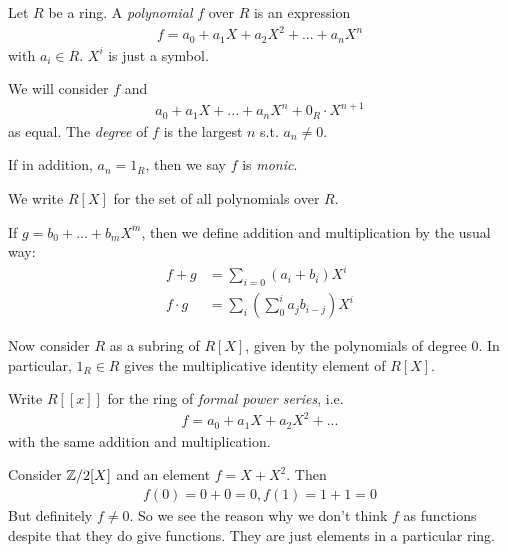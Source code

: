 \documentclass[a4paper]{article}
\begin{document}
\begin{eg}
Let $R$ be a ring. A \emph{polynomial} $f$ over $R$ is an expression
\begin{equation*}
\begin{aligned}
f=a_0+a_1X+a_2X^2 + ... + a_n X^n
\end{aligned}
\end{equation*}
with $a_i \in R$. $X^i$ is just a symbol.

We will consider $f$ and 
\begin{equation*}
\begin{aligned}
a_0+a_1 X +... + a_n X^n + 0_R \cdot X^{n+1}
\end{aligned}
\end{equation*}
as equal. The \emph{degree} of $f$ is the largest $n$ s.t. $a_n \neq 0$.

If in addition, $a_n = 1_R$, then we say $f$ is \emph{monic}.

We write $R[X]$ for the set of all polynomials over $R$.

If $g=b_0+...+b_m X^m$, then we define addition and multiplication by the usual way:
\begin{equation*}
\begin{aligned}
f+g &= \sum_{i=0} (a_i+b_i) X^i\\
f\cdot g &= \sum_i \left(\sum_0^i a_jb_{i-j}\right)X^i
\end{aligned}
\end{equation*}

Now consider $R$ as a subring of $R[X]$, given by the polynomials of degree $0$. In particular, $1_R \in R$ gives the multiplicative identity element of $R[X]$.
\end{eg}

\begin{eg}
Write $R[[x]]$ for the ring of \emph{formal power series}, i.e.
\begin{equation*}
\begin{aligned}
f =a_0+a_1 X + a_2 X^2 + ...
\end{aligned}
\end{equation*}
with the same addition and multiplication.

Consider $\mathbb{Z}/2[X]$ and an element $f = X+X^2$. Then
\begin{equation*}
\begin{aligned}
f(0)=0+0=0,
f(1) = 1+1=0
\end{aligned}
\end{equation*}
But definitely $f \neq 0$. So we see the reason why we don't think $f$ as functions despite that they do give functions. They are just elements in a particular ring.
\end{eg}
\end{document}
